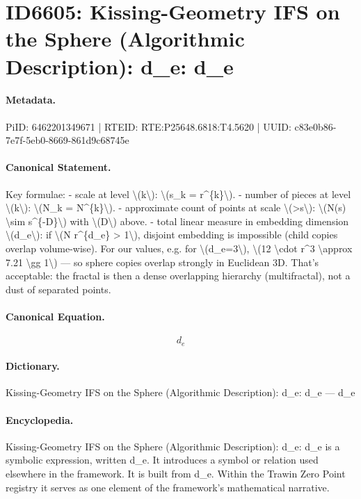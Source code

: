 \section*{ID6605: Kissing-Geometry IFS on the Sphere (Algorithmic Description): d\_e: d\_e}
\paragraph{Metadata.}
PiID: 6462201349671 | RTEID: RTE:P25648.6818:T4.5620 | UUID: c83e0b86-7e7f-5eb0-8669-861d9c68745e

\paragraph{Canonical Statement.}
Key formulae: - scale at level \textbackslash{}(k\textbackslash{}): \textbackslash{}(s\_k = r\textasciicircum{}\{k\}\textbackslash{}). - number of pieces at level \textbackslash{}(k\textbackslash{}): \textbackslash{}(N\_k = N\textasciicircum{}\{k\}\textbackslash{}). - approximate count of points at scale \textbackslash{}(>s\textbackslash{}): \textbackslash{}(N(s) \textbackslash{}sim s\textasciicircum{}\{-D\}\textbackslash{}) with \textbackslash{}(D\textbackslash{}) above. - total linear measure in embedding dimension \textbackslash{}(d\_e\textbackslash{}): if \textbackslash{}(N r\textasciicircum{}\{d\_e\} > 1\textbackslash{}), disjoint embedding is impossible (child copies overlap volume-wise). For our values, e.g. for \textbackslash{}(d\_e=3\textbackslash{}), \textbackslash{}(12 \textbackslash{}cdot r\textasciicircum{}3 \textbackslash{}approx 7.21 \textbackslash{}gg 1\textbackslash{}) — so sphere copies overlap strongly in Euclidean 3D. That’s acceptable: the fractal is then a dense overlapping hierarchy (multifractal), not a dust of separated points.

\paragraph{Canonical Equation.}
\[
d_e
\]

\paragraph{Dictionary.}
Kissing-Geometry IFS on the Sphere (Algorithmic Description): d\_e: d\_e — d\_e

\paragraph{Encyclopedia.}
Kissing-Geometry IFS on the Sphere (Algorithmic Description): d\_e: d\_e is a symbolic expression, written d\_e. It introduces a symbol or relation used elsewhere in the framework. It is built from d\_e. Within the Trawin Zero Point registry it serves as one element of the framework's mathematical narrative.
